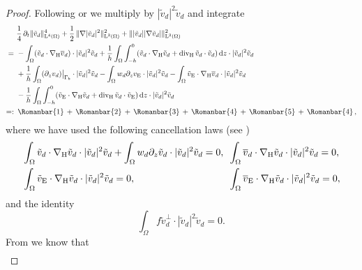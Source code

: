 \documentclass[preprint]{elsarticle}
\numberwithin{equation}{section}
\renewcommand{\d}{\, \mathrm{d}}
\DeclareMathOperator{\divH}{div_{\H}}
\renewcommand{\H}{\mathrm{H}}
\renewcommand{\bar}[1]{\overline{#1}}
\newcommand{\vbar}{\bar{v}}
\newcommand{\vtilde}{\tilde{v}}
\newcommand{\nablaH}{\nabla_{\H}}
\newcommand{\rL}{\mathrm{L}}
\newcommand{\rE}{\mathrm{E}}
\newcommand{\I}{\, \Romanbar{1} \, }
\newcommand{\II}{\, \Romanbar{2}\, }
\newcommand{\III}{\, \Romanbar{3}\, }
\newcommand{\IV}{\, \Romanbar{4}\, }
\newcommand{\V}{\, \Romanbar{5}\, }
\begin{document}
\begin{proof}
	Following \cite[Step 3]{HK:16_2} or \cite[Step 1]{GGHHK:20_2} we multiply by $|\vtilde_d|^2 \vtilde_d$ and integrate 
	\begin{equation*}
		\begin{aligned}
			&  \frac{1}{4} \, \partial_t \| \vtilde_d \|_{\rL^4(\Omega)}^4 
			+ \frac{1}{2} \, \| \nabla |\vtilde_d|^2 \|_{\rL^2(\Omega)}^2
			+ \| |\vtilde_d| |\nabla \vtilde_d| \|_{\rL^2(\Omega)}^2
			\\ 
			= \ &-\int_{\Omega} (\vtilde_d \cdot \nablaH \vbar_d) \cdot |\vtilde_d|^2 \vtilde_d + \frac{1}{h} \int_{\Omega} \int_{-h}^0 (\vtilde_d \cdot \nablaH \vtilde_d + \divH \vtilde_d \cdot \vtilde_d) \d z \cdot |\vtilde_d|^2 \vtilde_d  
			\\
			\ &+ \frac{1}{h} \int_{\Omega} (\partial_z v_d)\big|_{\Gamma_b} \cdot |\vtilde_d|^2 \vtilde_d
			-
			\int_{\Omega} w_d \partial_z v_{\rE} \cdot |\vtilde_d|^2 \vtilde_d 
			-
			\int_{\Omega} \vtilde_{\rE} \cdot \nablaH \vbar_d \cdot |\vtilde_d|^2 \vtilde_d \\
			&- \frac{1}{h} \int_{\Omega} \int_{-h}^0 (\vtilde_{\rE} \cdot \nablaH \vtilde_d + \divH \vtilde_d \cdot \vtilde_{\rE}) \d z \cdot |\vtilde_d|^2 \vtilde_d \\
			=: \ & \I + \II + \III + \IV + \V + \IV , 
		\end{aligned}
	\end{equation*}
	where we have used the following cancellation laws (see \cite[Lemma 6.3]{HK:16_2})
	\begin{equation*} 
		\begin{aligned}
			&\int_{\Omega} \vtilde_d \cdot \nablaH \vtilde_d \cdot |\vtilde_d|^2 \vtilde_d  + \int_{\Omega} w_d \partial_z \vtilde_d \cdot |\vtilde_d|^2 \vtilde_d = 0, \hspace{-0.5em} 
			&&\int_{\Omega} \vbar_d \cdot \nablaH \vtilde_d \cdot |\vtilde_d|^2 \vtilde_d = 0, \\
			&\int_{\Omega} \vtilde_{\rE} \cdot \nablaH \vtilde_d \cdot |\vtilde_d|^2 \vtilde_d = 0, &&\int_{\Omega} \vbar_{\rE} \cdot \nablaH \vtilde_d \cdot |\vtilde_d|^2 \vtilde_d = 0 ,
		\end{aligned}
	\end{equation*}
	and the identity
	\begin{equation*}
		\int_{\Omega} f \vtilde_d^\perp \cdot |\vtilde_d|^2 \vtilde_d = 0 .
	\end{equation*}
	From \cite[Step 3, (6.9)]{HK:16_2} we know that
	\begin{align*}

\end{align*}
\end{proof}
\end{document}
